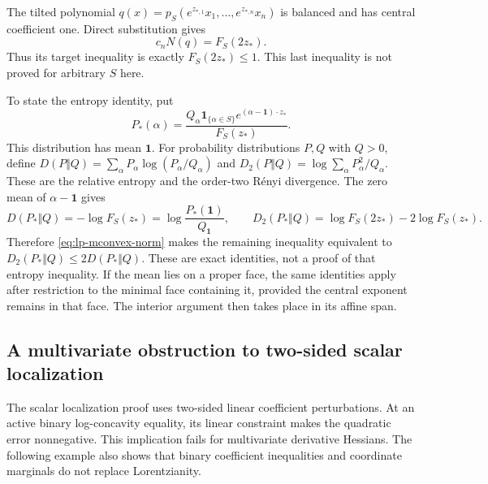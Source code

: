 \documentclass[11pt,a4paper]{article}
\theoremstyle{definition}
\theoremstyle{remark}
\begin{document}
The tilted polynomial $q(x)=p_S(e^{z_{*,1}}x_1,\ldots,e^{z_{*,n}}x_n)$ is balanced and has central coefficient one.
Direct substitution gives
\begin{equation}\label{eq:lp-mconvex-norm}
 c_nN(q)=F_S(2z_*).
\end{equation}
Thus its target inequality is exactly $F_S(2z_*)\le1$.
This last inequality is not proved for arbitrary $S$ here.

To state the entropy identity, put
\[
 P_*(\alpha)=\frac{Q_\alpha\mathbf1_{\{\alpha\in S\}}
 e^{(\alpha-\mathbf1)\cdot z_*}}{F_S(z_*)}.
\]
This distribution has mean $\mathbf1$.
For probability distributions $P,Q$ with $Q>0$, define
$D(P\Vert Q)=\sum_\alpha P_\alpha\log(P_\alpha/Q_\alpha)$ and
$D_2(P\Vert Q)=\log\sum_\alpha P_\alpha^2/Q_\alpha$.
These are the relative entropy and the order-two R\'enyi divergence.
The zero mean of $\alpha-\mathbf1$ gives
\[
 D(P_*\Vert Q)=-\log F_S(z_*)=\log\frac{P_*(\mathbf1)}{Q_{\mathbf1}},
 \qquad
 D_2(P_*\Vert Q)=\log F_S(2z_*)-2\log F_S(z_*).
\]
Therefore \eqref{eq:lp-mconvex-norm} makes the remaining inequality equivalent to
$D_2(P_*\Vert Q)\le2D(P_*\Vert Q)$.
These are exact identities, not a proof of that entropy inequality.
If the mean lies on a proper face, the same identities apply after restriction to the minimal face containing it, provided the central exponent remains in that face.
The interior argument then takes place in its affine span.


\subsection{A multivariate obstruction to two-sided scalar localization}
\label{sec:multivariate-localization-obstruction}

The scalar localization proof uses two-sided linear coefficient perturbations.
At an active binary log-concavity equality, its linear constraint makes the quadratic error nonnegative.
This implication fails for multivariate derivative Hessians.
The following example also shows that binary coefficient inequalities and coordinate marginals do not replace Lorentzianity.
\end{document}
